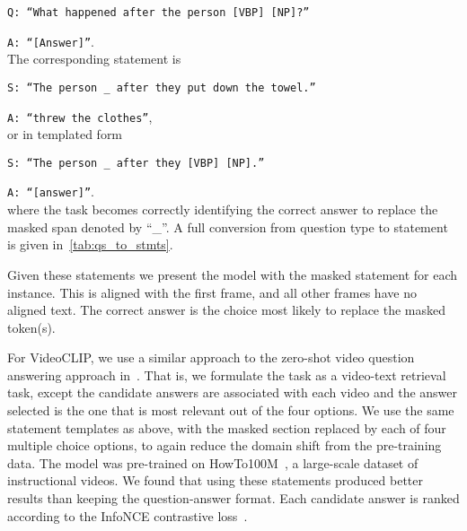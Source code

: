 \texttt{Q: ``What happened after the person [VBP] [NP]?''} 

\texttt{A: ``[Answer]''}.\\
The corresponding statement is

\texttt{S: ``The person \_ after they put down the towel.''}

\texttt{A: ``threw the clothes''},\\
or in templated form

\texttt{S: ``The person \_ after they [VBP] [NP].''}

\texttt{A: ``[answer]''}.\\
where the task becomes correctly identifying the correct answer to replace the
masked span denoted by ``\_''. A full conversion from question type to
statement is given in~\cref{tab:qs_to_stmts}.

Given these statements we present the model with the masked statement for each
instance. This is aligned with the first frame, and all other frames have no
aligned text. The correct answer is the choice most likely to replace the
masked token(s).


For VideoCLIP, we use a similar approach to the zero-shot video question
answering approach in~\citet{xu2021videoclip}. That is, we formulate the task
as a video-text retrieval task, except the candidate answers are associated
with each video and the answer selected is the one that is most relevant out of
the four options. We use the same statement templates as above, with the masked
section replaced by each of four multiple choice options, to again reduce the
domain shift from the pre-training data. The model was pre-trained on
HowTo100M~\citep{miech2019howto100m}, a large-scale dataset of instructional
videos. We found that using these statements produced better results than
keeping the question-answer format. Each candidate answer is ranked according
to the InfoNCE contrastive loss~\citep{oord2019infonce}.


